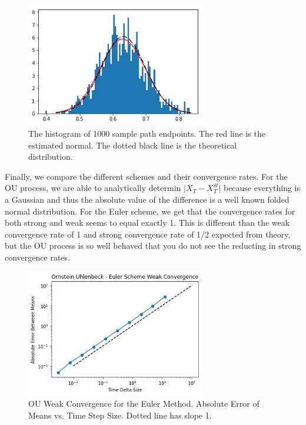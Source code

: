 \documentclass[onecolumn,notitlepage,pra,10pt,aps]{revtex4-1}
\begin{document}
  \begin{figure}[H]
    \centering
      \includegraphics[width=0.7\textwidth]{normal_ou.png}
    \caption{The histogram of 1000 sample path endpoints. The red line is the estimated normal. The dotted black line is the theoretical distribution.}
  \end{figure}

  Finally, we compare the different schemes and their convergence rates. For the OU process, we are able to analytically determin $\lvert X_T - X_T^{\delta t} \rvert$ because everything is a Gaussian and thus the absolute value of the difference is a well known folded normal distribution. For the Euler scheme, we get that the convergence rates for both strong and weak seems to equal exactly 1. This is different than the weak convergence rate of 1 and strong convergence rate of 1/2 expected from theory, but the OU process is so well behaved that you do not see the reducting in strong convergence rates.

  \begin{figure}[H]
    \centering
      \includegraphics[width=0.7\textwidth]{ou_weak_euler.png}
    \caption{OU Weak Convergence for the Euler Method. Absolute Error of Means vs. Time Step Size. Dotted line has slope 1.}
  \end{figure}
\end{document}
